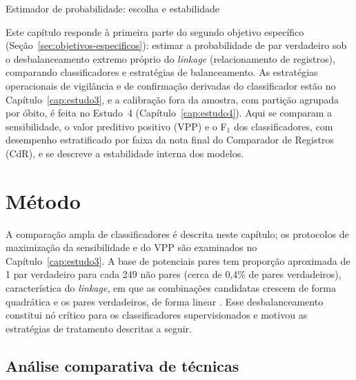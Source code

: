 \begin{chapter}{Estimador de probabilidade: escolha e estabilidade}\label{cap:estudo2}

Este capítulo responde à primeira parte do segundo objetivo específico (Seção~\ref{sec:objetivos-especificos}): estimar a probabilidade de par verdadeiro sob o desbalanceamento extremo próprio do \textit{linkage} (relacionamento de registros), comparando classificadores e estratégias de balanceamento. As estratégias operacionais de vigilância e de confirmação derivadas do classificador estão no Capítulo~\ref{cap:estudo3}, e a calibração fora da amostra, com partição agrupada por óbito, é feita no Estudo~4 (Capítulo~\ref{cap:estudo4}). Aqui se comparam a sensibilidade, o valor preditivo positivo (VPP) e o F$_1$ dos classificadores, com desempenho estratificado por faixa da nota final do Comparador de Registros (CdR), e se descreve a estabilidade interna dos modelos.

\section{Método}\label{sec:e2-metodo}

A comparação ampla de classificadores é descrita neste capítulo; os protocolos de maximização da sensibilidade e do VPP são examinados no Capítulo~\ref{cap:estudo3}. A base de potenciais pares tem proporção aproximada de 1 par verdadeiro para cada 249 não pares (cerca de 0,4\% de pares verdadeiros), característica do \textit{linkage}, em que as combinações candidatas crescem de forma quadrática e os pares verdadeiros, de forma linear \cite{Christen2012book}. Esse desbalanceamento constitui nó crítico para os classificadores supervisionados \cite{He2009imbalanced} e motivou as estratégias de tratamento descritas a seguir.

\subsection{Análise comparativa de técnicas}\label{sec:analise-comparativa}


\end{chapter}
